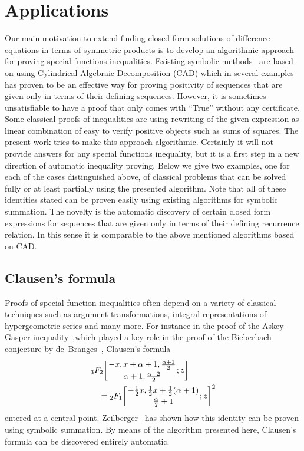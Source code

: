 \documentclass{article}
\begin{document}
\section{Applications}
\label{apps}
Our main motivation to extend finding closed form solutions of difference equations in
terms of symmetric products is to develop an algorithmic approach for proving special
functions inequalities. Existing symbolic methods~\cite{GKIneq,MKSumCracker,MKVP10} are
based on using Cylindrical Algebraic Decomposition (CAD) which in several examples has
proven to be an effective way for proving positivity of sequences that are given only in
terms of their defining sequences. However, it is sometimes unsatisfiable to have a proof
that only comes with ``True'' without any certificate. Some classical proofs of
inequalities are using rewriting of the given expression as linear combination of easy to
verify positive objects such as sums of squares. The present work tries to make this
approach algorithmic. Certainly it will not provide answers for any special functions
inequality, but it is a first step in a new direction of automatic inequality proving.
Below we give two examples, one for each of the cases distinguished above, of classical
problems that can be solved fully or at least partially using the presented algorithm.
Note that all of these identities stated can be proven easily using existing algorithms
for symbolic summation. The novelty is the automatic discovery of certain closed form
expressions for sequences that are given only in terms of their defining recurrence
relation. In this sense it is comparable to the above mentioned algorithms based on CAD.

\subsection{Clausen's formula} \label{Clausen} 

Proofs of special function inequalities often depend on a variety of classical techniques
such as argument transformations, integral representations of hypergeometric series and
many more. For instance in the proof of the Askey-Gasper inequality~\cite{AG76},which
played a key role in the proof of the Bieberbach conjecture by
de~Branges~\cite{deBranges}, Clausen's formula
\begin{align}\label{cl}
&{}_3F_2\biggl[\genfrac{}{}{0pt}{}{-x, x+\alpha+1, \frac{\alpha+1}{2}}{\alpha+1, \frac{\alpha+2}{2}}  ; z \biggl] \\
&\quad= {}_2F_1\biggl[\genfrac{}{}{0pt}{}{-\frac12x, \frac12x+\frac12(\alpha+1)}{\frac{\alpha}{2}+1} ; z \biggl]^2\nonumber
\end{align}
entered at a central point. Zeilberger~\cite{SBE93} has shown how this identity can be
proven using symbolic summation. By means of the algorithm presented here, Clausen's formula
can be discovered entirely automatic.
\end{document}
